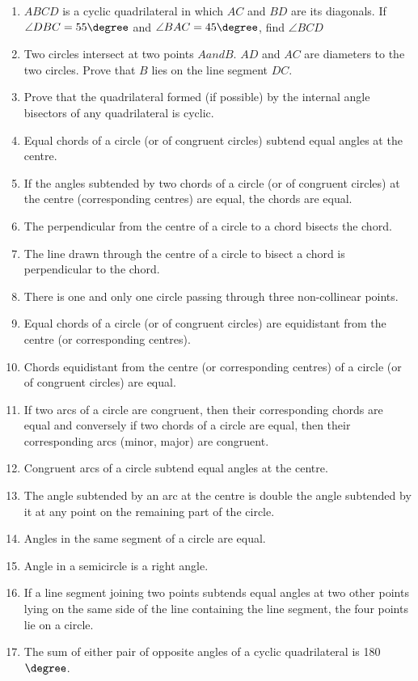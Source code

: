 \begin{enumerate}[label=\arabic*.,ref=\thesubsection.\theenumi]
\item $ABCD$ is a cyclic quadrilateral in which $AC$ and $BD$ are its diagonals. If $\angle DBC = 55\degree$ and $\angle BAC = 45\degree$, find $\angle BCD$
\item Two circles intersect at two points $A and B$. $AD$ and $AC$ are diameters to the two circles. Prove that $B$ lies on the line segment $DC$.
\item Prove that the quadrilateral formed (if possible) by the internal angle bisectors of any quadrilateral is cyclic.
\item  Equal chords of a circle (or of congruent circles) subtend equal angles at the centre. 
\item  If the angles subtended by two chords of a circle (or of congruent circles) at the centre (corresponding centres) are equal, the chords are equal.
\item  The perpendicular from the centre of a circle to a chord bisects the chord. 
\item  The line drawn through the centre of a circle to bisect a chord is perpendicular to the chord.
\item  There is one and only one circle passing through three non-collinear points. 
\item  Equal chords of a circle (or of congruent circles) are equidistant from the centre (or corresponding centres).
\item Chords equidistant from the centre (or corresponding centres) of a circle (or of congruent circles) are equal.
\item  If two arcs of a circle are congruent, then their corresponding chords are equal and conversely if two chords of a circle are equal, then their corresponding arcs (minor, major) are congruent.
\item Congruent arcs of a circle subtend equal angles at the centre. 
\item  The angle subtended by an arc at the centre is double the angle subtended by it at any point on the remaining part of the circle.
\item Angles in the same segment of a circle are equal. \item  Angle in a semicircle is a right angle. 
\item  If a line segment joining two points subtends equal angles at two other points lying on the same side of the line containing the line segment, the four points lie on a circle. 
\item  The sum of either pair of opposite angles of a cyclic quadrilateral is 180$\degree$.

\end{enumerate}
